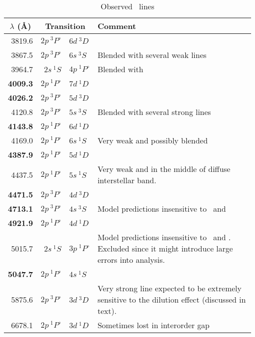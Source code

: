 \begin{table} %
\begin{center}
\caption{Observed \hei\ lines}
\begin{tabular}{rr@{ -- }lp{10cm}}
\hline\hline
\multicolumn{1}{c}{$\lambda$ (\AA)} & \multicolumn{2}{c}{Transition} &
Comment \\ 
\hline
3819.6 		& $2p~^3P^\circ$ & $6d~^3D$	& \\
3867.5 		& $2p~^3P^\circ$ & $6s~^3S$	& Blended with several weak lines\\
3964.7 		& $2s~^1S$ & $4p~^1P^\circ$	& Blended with \hi \\
\textbf{4009.3} & $2p~^1P^\circ$ & $7d~^1D$	& \\
\textbf{4026.2} & $2p~^3P^\circ$ & $5d~^3D$	& \\
4120.8 		& $2p~^3P^\circ$ & $5s~^3S$ 	& Blended with several strong lines\\
\textbf{4143.8} & $2p~^1P^\circ$ & $6d~^1D$	& \\
4169.0 		& $2p~^1P^\circ$ & $6s~^1S$	& Very weak and possibly blended\\
\textbf{4387.9} & $2p~^1P^\circ$ & $5d~^1D$	& \\
4437.5 		& $2p~^1P^\circ$ & $5s~^1S$	& Very weak and in the middle of diffuse
     						interstellar band.\\
\textbf{4471.5} & $2p~^3P^\circ$ & $4d~^3D$	& \\
\textbf{4713.1} & $2p~^3P^\circ$ & $4s~^3S$	& Model predictions
     						insensitive to \teff\
     						and \logg\\
\textbf{4921.9}	& $2p~^1P^\circ$ & $4d~^1D$	& \\
5015.7 		& $2s~^1S$ & $3p~^1P^\circ$ 	& Model predictions insensitive to
     						\teff\ and
     						\logg. Excluded since
     						it might introduce
     						large errors into
     						analysis.\\  
\textbf{5047.7} & $2p~^1P^\circ$ & $4s~^1S$	& \\
5875.6 		& $2p~^3P^\circ$ & $3d~^3D$ 	& Very strong line expected to be
						extremely sensitive to
						the dilution effect
						(discussed in text).\\
6678.1 		& $2p~^1P^\circ$ & $3d~^1D$	& Sometimes lost in interorder gap\\

\hline\hline
\end{tabular}
\label{ta:he1_lines}
\end{center}
\end{table} %

